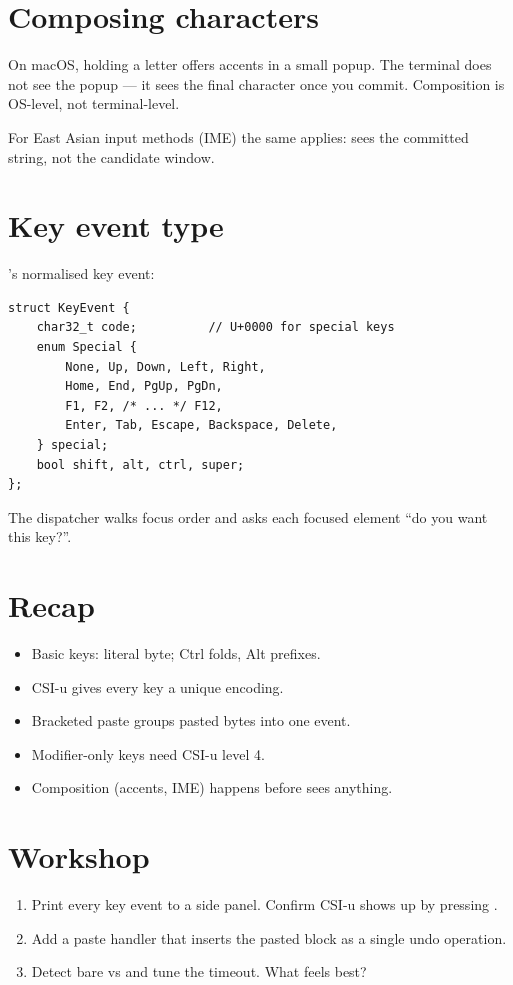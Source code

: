 \section{Composing characters}

On macOS, holding a letter offers accents in a small popup.
The terminal does not see the popup --- it sees the final
character once you commit. Composition is OS-level, not
terminal-level.

For East Asian input methods (IME) the same applies: \maya{}
sees the committed string, not the candidate window.

\section{Key event type}

\maya{}'s normalised key event:

\begin{lstlisting}
struct KeyEvent {
    char32_t code;          // U+0000 for special keys
    enum Special {
        None, Up, Down, Left, Right,
        Home, End, PgUp, PgDn,
        F1, F2, /* ... */ F12,
        Enter, Tab, Escape, Backspace, Delete,
    } special;
    bool shift, alt, ctrl, super;
};
\end{lstlisting}

The dispatcher walks focus order and asks each focused
element ``do you want this key?''.

\section{Recap}

\begin{recap}
\begin{itemize}[leftmargin=*]
  \item Basic keys: literal byte; Ctrl folds, Alt prefixes.
  \item CSI-u gives every key a unique encoding.
  \item Bracketed paste groups pasted bytes into one event.
  \item Modifier-only keys need CSI-u level 4.
  \item Composition (accents, IME) happens before \maya{}
    sees anything.
\end{itemize}
\end{recap}

\section*{Workshop}

\begin{enumerate}[leftmargin=*]
  \item Print every key event to a side panel. Confirm
    CSI-u shows up by pressing .
  \item Add a paste handler that inserts the pasted block
    as a single undo operation.
  \item Detect bare  vs  and tune the
    timeout. What feels best?
\end{enumerate}
